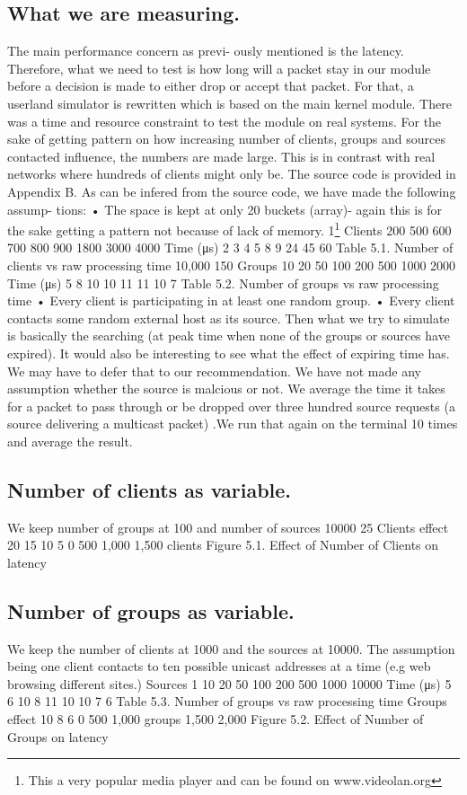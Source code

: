 \subsection{What we are measuring.} The main performance concern as previ-
ously mentioned is the latency. Therefore, what we need to test is how long will a
packet stay in our module before a decision is made to either drop or accept that
packet. For that, a userland simulator is rewritten which is based on the main
kernel module. There was a time and resource constraint to test the module on
real systems.
For the sake of getting pattern on how increasing number of clients, groups and
sources contacted influence, the numbers are made large. This is in contrast with
real networks where hundreds of clients might only be. The source code is provided
in Appendix B.
As can be infered from the source code, we have made the following assump-
tions:
• The space is kept at only 20 buckets (array)- again this is for the sake
getting a pattern not because of lack of memory.
1\footnote{This a very popular media player and can be found on www.videolan.org}
Clients
200 500 600 700 800 900 1800 3000 4000
Time (μs) 2
3
4
5
8
9
24
45
60
Table 5.1. Number of clients vs raw processing time
10,000
150
Groups
10 20 50 100 200 500 1000 2000
Time (μs) 5 8 10 10 11
11
10
7
Table 5.2. Number of groups vs raw processing time
• Every client is participating in at least one random group.
• Every client contacts some random external host as its source.
Then what we try to simulate is basically the searching (at peak time when none
of the groups or sources have expired). It would also be interesting to see what the
effect of expiring time has. We may have to defer that to our recommendation. We
have not made any assumption whether the source is malcious or not. We average
the time it takes for a packet to pass through or be dropped over three hundred
source requests (a source delivering a multicast packet) .We run that again on the
terminal 10 times and average the result.
\subsection{Number of clients as variable.} We keep number of groups at 100
and number of sources 10000
25
Clients effect
20
15
10
5
0
500
1,000
1,500
clients
Figure 5.1. Effect of Number of Clients on latency
\subsection{Number of groups as variable.} We keep the number of clients at
1000 and the sources at 10000. The assumption being one client contacts to ten
possible unicast addresses at a time (e.g web browsing different sites.)
Sources
1 10 20 50 100 200 500 1000 10000
Time (μs) 5 6 10 8 11
10 10
7
6
Table 5.3. Number of groups vs raw processing time
Groups effect
10
8
6
0
500
1,000
groups
1,500
2,000
Figure 5.2. Effect of Number of Groups on latency
